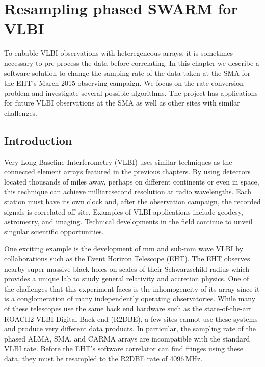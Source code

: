 \newcommand{\z}{\mathpzc{z}}
\newcommand{\falign}{0}
\newcommand{\talign}{7.5}

\chapter{Resampling phased SWARM for VLBI}
\label{chap:aphids}


To enbable VLBI observations with heteregeneous arrays, it is sometimes necessary to pre-process
the data before correlating.  In this chapter we describe a software solution to change the 
samping rate of the data taken at the SMA for the EHT's March 2015 observing campaign.  We 
focus on the rate conversion problem and investigate several possible algorithms.  The project
has applications for future VLBI observations at the SMA as well as other sites with similar 
challenges.

\section{Introduction}

Very Long Baseline Interferometry (VLBI) uses similar techniques as the connected element arrays
featured in the previous chapters.  By using detectors located thousands of miles away, perhaps on different 
continents or even in space, this technique can achieve milliarcsecond resolution at radio wavelengths.  Each 
station must have its own clock and, after the observation campaign, the recorded signals is correlated off-site. 
Examples of VLBI applications include geodesy, astrometry, and imaging. Technical developments in the 
field continue to unveil singular scientific opportunities.

One exciting example is the development of mm and sub-mm wave VLBI by collaborations such as the Event Horizon
Telescope (EHT).  The EHT observes nearby super massive black holes on scales of their Schwarzschild radius which
provides a unique lab to study 
general relativity and accretion physics.  One of the challenges that this experiment faces is the inhomogeneity 
of its array since it is a conglomeration of many independently operating observatories.
While many of these telescopes use the same back end hardware such as the state-of-the-art 
ROACH2 VLBI Digital Back-end (R2DBE), a few sites 
cannot use these systems and produce very 
different data products. In particular, the sampling rate of the phased ALMA, SMA, and CARMA arrays are 
incompatible with the standard VLBI rate.  Before the EHT's software correlator
\citep[DIFX;][]{deller07} can find fringes using these data, they must be resampled to the R2DBE rate of 
4096\,MHz.  

